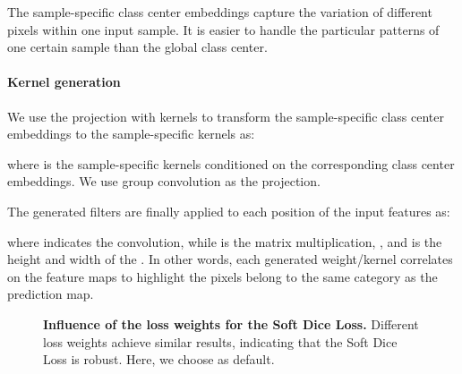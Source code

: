 \documentclass[journal]{IEEEtran}
\begin{document}
The sample-specific class center embeddings 
capture the variation of different pixels within one input sample.
It is easier to handle the particular patterns of one certain sample
than the global class center.

\paragraph{Kernel generation}
We use the projection  with kernels  to transform
the sample-specific class center embeddings
to the sample-specific kernels as:

where  is the sample-specific kernels 
conditioned on the corresponding class center embeddings.
We use group  convolution as the projection.

The generated filters are finally applied to each position of the input features 
as:

where 
 indicates the convolution, while  is the matrix multiplication,
,  and  is the height and width of the .
In other words, 
each generated weight/kernel 
correlates on the feature maps to highlight 
the pixels belong to the same category 
as the prediction map.

\begin{figure}[t]
\centering
{}
\caption{\textbf{Influence of the loss weights for the Soft Dice Loss.}
Different loss weights achieve similar results, indicating that the Soft Dice Loss is robust.
Here, we choose  as default.}
\label{fig:loss_weight}
\end{figure}
\end{document}

